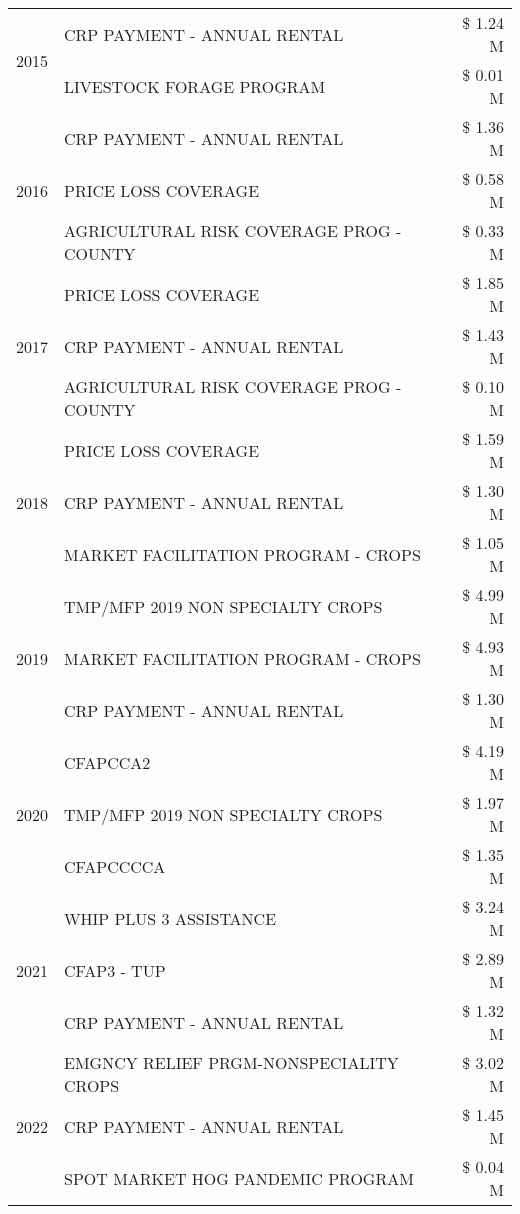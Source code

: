 \begin{tabular}{llr}
\multirow[t]{2}{*}{2015} & CRP PAYMENT - ANNUAL RENTAL & \$ 1.24 M \\
 & LIVESTOCK FORAGE PROGRAM & \$ 0.01 M \\
\cline{1-3}
\multirow[t]{3}{*}{2016} & CRP PAYMENT - ANNUAL RENTAL & \$ 1.36 M \\
 & PRICE LOSS COVERAGE & \$ 0.58 M \\
 & AGRICULTURAL RISK COVERAGE PROG - COUNTY & \$ 0.33 M \\
\cline{1-3}
\multirow[t]{3}{*}{2017} & PRICE LOSS COVERAGE & \$ 1.85 M \\
 & CRP PAYMENT - ANNUAL RENTAL & \$ 1.43 M \\
 & AGRICULTURAL RISK COVERAGE PROG - COUNTY & \$ 0.10 M \\
\cline{1-3}
\multirow[t]{3}{*}{2018} & PRICE LOSS COVERAGE & \$ 1.59 M \\
 & CRP PAYMENT - ANNUAL RENTAL & \$ 1.30 M \\
 & MARKET FACILITATION PROGRAM - CROPS & \$ 1.05 M \\
\cline{1-3}
\multirow[t]{3}{*}{2019} & TMP/MFP 2019 NON SPECIALTY CROPS & \$ 4.99 M \\
 & MARKET FACILITATION PROGRAM - CROPS & \$ 4.93 M \\
 & CRP PAYMENT - ANNUAL RENTAL & \$ 1.30 M \\
\cline{1-3}
\multirow[t]{3}{*}{2020} & CFAPCCA2 & \$ 4.19 M \\
 & TMP/MFP 2019 NON SPECIALTY CROPS & \$ 1.97 M \\
 & CFAPCCCCA & \$ 1.35 M \\
\cline{1-3}
\multirow[t]{3}{*}{2021} & WHIP PLUS 3 ASSISTANCE & \$ 3.24 M \\
 & CFAP3 - TUP & \$ 2.89 M \\
 & CRP PAYMENT - ANNUAL RENTAL & \$ 1.32 M \\
\cline{1-3}
\multirow[t]{3}{*}{2022} & EMGNCY RELIEF PRGM-NONSPECIALITY CROPS & \$ 3.02 M \\
 & CRP PAYMENT - ANNUAL RENTAL & \$ 1.45 M \\
 & SPOT MARKET HOG PANDEMIC PROGRAM & \$ 0.04 M \\
\cline{1-3}
\bottomrule
\end{tabular}
